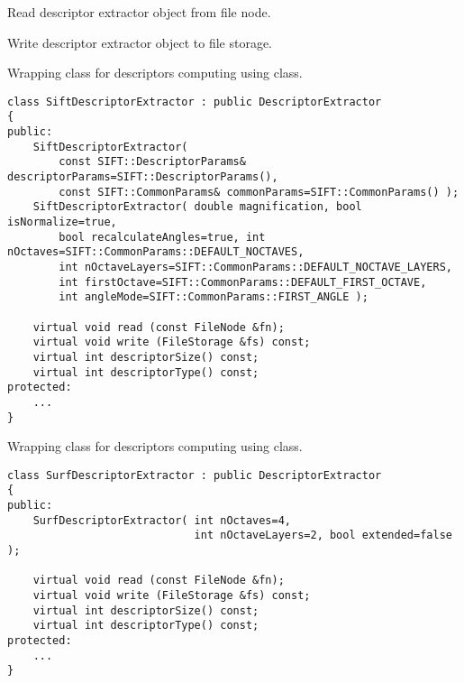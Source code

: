 Read descriptor extractor object from file node.


\begin{description}
\end{description}

Write descriptor extractor object to file storage.


\begin{description}
\end{description}

Wrapping class for descriptors computing using  class.

\begin{lstlisting}
class SiftDescriptorExtractor : public DescriptorExtractor
{
public:
    SiftDescriptorExtractor( 
        const SIFT::DescriptorParams& descriptorParams=SIFT::DescriptorParams(),
        const SIFT::CommonParams& commonParams=SIFT::CommonParams() );
    SiftDescriptorExtractor( double magnification, bool isNormalize=true, 
        bool recalculateAngles=true, int nOctaves=SIFT::CommonParams::DEFAULT_NOCTAVES,
        int nOctaveLayers=SIFT::CommonParams::DEFAULT_NOCTAVE_LAYERS,
        int firstOctave=SIFT::CommonParams::DEFAULT_FIRST_OCTAVE,
        int angleMode=SIFT::CommonParams::FIRST_ANGLE );

    virtual void read (const FileNode &fn);
    virtual void write (FileStorage &fs) const;
    virtual int descriptorSize() const;
    virtual int descriptorType() const;
protected:
    ...
}
\end{lstlisting}

Wrapping class for descriptors computing using  class.

\begin{lstlisting}
class SurfDescriptorExtractor : public DescriptorExtractor
{
public:
    SurfDescriptorExtractor( int nOctaves=4,
                             int nOctaveLayers=2, bool extended=false );

    virtual void read (const FileNode &fn);
    virtual void write (FileStorage &fs) const;
    virtual int descriptorSize() const;
    virtual int descriptorType() const;
protected:
    ...
}
\end{lstlisting}

